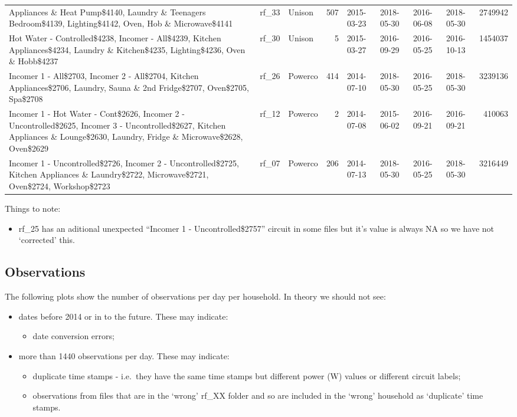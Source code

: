 \documentclass[]{article}
\providecommand{\tightlist}{%
  \setlength{\itemsep}{0pt}\setlength{\parskip}{0pt}}
\begin{document}
\begin{longtable}[]{@{}lllrllllr@{}}
Appliances \& Heat Pump\$4140, Laundry \& Teenagers Bedroom\$4139,
Lighting\$4142, Oven, Hob \& Microwave\$4141 & rf\_33 & Unison & 507 &
2015-03-23 & 2018-05-30 & 2016-06-08 & 2018-05-30 &
2749942\tabularnewline
Hot Water - Controlled\$4238, Incomer - All\$4239, Kitchen
Appliances\$4234, Laundry \& Kitchen\$4235, Lighting\$4236, Oven \&
Hobb\$4237 & rf\_30 & Unison & 5 & 2015-03-27 & 2016-09-29 & 2016-05-25
& 2016-10-13 & 1454037\tabularnewline
Incomer 1 - All\$2703, Incomer 2 - All\$2704, Kitchen Appliances\$2706,
Laundry, Sauna \& 2nd Fridge\$2707, Oven\$2705, Spa\$2708 & rf\_26 &
Powerco & 414 & 2014-07-10 & 2018-05-30 & 2016-05-25 & 2018-05-30 &
3239136\tabularnewline
Incomer 1 - Hot Water - Cont\$2626, Incomer 2 - Uncontrolled\$2625,
Incomer 3 - Uncontrolled\$2627, Kitchen Appliances \& Lounge\$2630,
Laundry, Fridge \& Microwave\$2628, Oven\$2629 & rf\_12 & Powerco & 2 &
2014-07-08 & 2015-06-02 & 2016-09-21 & 2016-09-21 &
410063\tabularnewline
Incomer 1 - Uncontrolled\$2726, Incomer 2 - Uncontrolled\$2725, Kitchen
Appliances \& Laundry\$2722, Microwave\$2721, Oven\$2724, Workshop\$2723
& rf\_07 & Powerco & 206 & 2014-07-13 & 2018-05-30 & 2016-05-25 &
2018-05-30 & 3216449\tabularnewline
\bottomrule
\end{longtable}

Things to note:

\begin{itemize}
\tightlist
\item
  rf\_25 has an aditional unexpected ``Incomer 1 - Uncontrolled\$2757''
  circuit in some files but it's value is always NA so we have not
  `corrected' this.
\end{itemize}

\subsection{Observations}\label{observations}

The following plots show the number of observations per day per
household. In theory we should not see:

\begin{itemize}
\tightlist
\item
  dates before 2014 or in to the future. These may indicate:

  \begin{itemize}
  \tightlist
  \item
    date conversion errors;
  \end{itemize}
\item
  more than 1440 observations per day. These may indicate:

  \begin{itemize}
  \tightlist
  \item
    duplicate time stamps - i.e.~they have the same time stamps but
    different power (W) values or different circuit labels;
  \item
    observations from files that are in the `wrong' rf\_XX folder and so
    are included in the `wrong' household as `duplicate' time stamps.
  \end{itemize}
\end{itemize}
\end{document}
